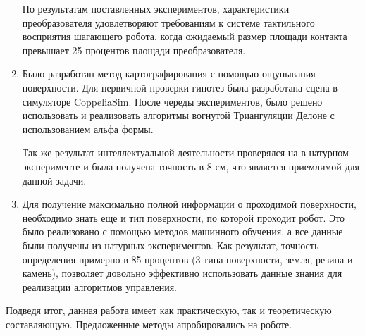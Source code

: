 \begin{enumerate}
  По результатам поставленных экспериментов, характеристики преобразователя удовлетворяют требованиям к системе тактильного восприятия шагающего робота, когда ожидаемый размер площади контакта превышает 25 процентов площади преобразователя.
  \item Было разработан метод картографирования с помощью ощупывания поверхности. Для первичной проверки гипотез была разработана сцена в симуляторе CoppeliaSim. После череды экспериментов, было решено использовать и реализовать алгоритмы вогнутой Триангуляции Делоне с использованием альфа формы.

  Так же результат интеллектуальной деятельности проверялся на в натурном эксперименте и была получена точность в 8 см, что является приемлимой для данной задачи.
  \item Для получение максимально полной информации о проходимой поверхности, необходимо знать еще и тип поверхности, по которой проходит робот. Это было реализовано с помощью методов машинного обучения, а все данные были получены из натурных экспериментов. Как результат, точность определения примерно в 85 процентов (3 типа поверхности, земля, резина и камень), позволяет довольно эффективно использовать данные знания для реализации алгоритмов управления.
\end{enumerate}

Подведя итог, данная работа имеет как практическую, так и теоретическую составляющую. Предложенные методы апробировались на роботе.